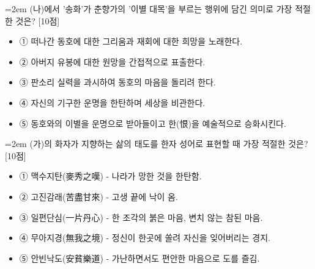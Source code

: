 \documentclass[10pt,a4paper]{article}
\newcommand{\qnum}[1]{%
  \tikz[baseline=(num.base)]{%
    \node[circle, fill=numCircle, text=white, inner sep=0pt,
          minimum size=18pt, font=\small\bfseries] (num) {#1};%
  }%
}
\newcommand{\pts}[1]{%
  \hfill\textcolor{ptsBadge}{[#1점]}%
}
\begin{document}
\vspace{4mm}
\begin{minipage}{\columnwidth}
{\hangindent=2em
\qnum{39}\enspace (나)에서 '송화'가 춘향가의 '이별 대목'을 부르는 행위에 담긴 의미로 가장 적절한 것은? \pts{10}
\par}

\vspace{3mm}
\begin{itemize}[leftmargin=2.5em, labelsep=0.3em, label={}, itemsep=4pt, parsep=1pt, topsep=0pt]
  \item ① 떠나간 동호에 대한 그리움과 재회에 대한 희망을 노래한다.
  \item ② 아버지 유봉에 대한 원망을 간접적으로 표출한다.
  \item ③ 판소리 실력을 과시하여 동호의 마음을 돌리려 한다.
  \item ④ 자신의 기구한 운명을 한탄하며 세상을 비관한다.
  \item ⑤ 동호와의 이별을 운명으로 받아들이고 한(恨)을 예술적으로 승화시킨다.
\end{itemize}
\end{minipage}
\vspace{4mm}

\vspace{4mm}
\begin{minipage}{\columnwidth}
{\hangindent=2em
\qnum{40}\enspace (가)의 화자가 지향하는 삶의 태도를 한자 성어로 표현할 때 가장 적절한 것은? \pts{10}
\par}

\vspace{3mm}
\begin{itemize}[leftmargin=2.5em, labelsep=0.3em, label={}, itemsep=4pt, parsep=1pt, topsep=0pt]
  \item ① 맥수지탄(麥秀之嘆) - 나라가 망한 것을 한탄함.
  \item ② 고진감래(苦盡甘來) - 고생 끝에 낙이 옴.
  \item ③ 일편단심(一片丹心) - 한 조각의 붉은 마음, 변치 않는 참된 마음.
  \item ④ 무아지경(無我之境) - 정신이 한곳에 쏠려 자신을 잊어버리는 경지.
  \item ⑤ 안빈낙도(安貧樂道) - 가난하면서도 편안한 마음으로 도를 즐김.
\end{itemize}
\end{minipage}
\vspace{4mm}
\end{document}
